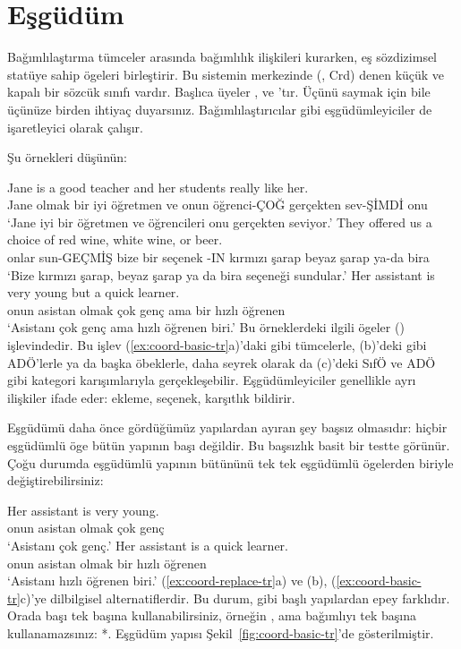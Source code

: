 \section{Eşgüdüm}\label{sec:coordination-tr}

Bağımlılaştırma tümceler arasında bağımlılık ilişkileri kurarken,  eş sözdizimsel statüye sahip ögeleri birleştirir. Bu sistemin merkezinde  (, Crd) denen küçük ve kapalı bir sözcük sınıfı vardır. Başlıca üyeler ,  ve 'tır. Üçünü saymak için bile üçünüze birden ihtiyaç duyarsınız. Bağımlılaştırıcılar gibi eşgüdümleyiciler de işaretleyici olarak çalışır.

Şu örnekleri düşünün:

\ea \label{ex:coord-basic-tr}
    \ea \gll {\ob}Jane is a good teacher{\cb} {\ob}and her students really like her{\cb}.\\
        Jane olmak bir iyi öğretmen ve onun öğrenci-ÇOĞ gerçekten sev-ŞİMDİ onu\\
    \glt `Jane iyi bir öğretmen ve öğrencileri onu gerçekten seviyor.'
    \ex \gll They offered us a choice of {\ob}red wine{\cb}, {\ob}white wine{\cb}, {\ob}or beer{\cb}.\\
        onlar sun-GEÇMİŞ bize bir seçenek -IN kırmızı şarap beyaz şarap ya-da bira\\
    \glt `Bize kırmızı şarap, beyaz şarap ya da bira seçeneği sundular.'
    \ex \gll Her assistant is {\ob}very young{\cb} {\ob}but a quick learner{\cb}.\\
        onun asistan olmak çok genç ama bir hızlı öğrenen\\
    \glt `Asistanı çok genç ama hızlı öğrenen biri.'
    \z
\z
Bu örneklerdeki ilgili ögeler  () işlevindedir. Bu işlev (\ref{ex:coord-basic-tr}a)'daki gibi tümcelerle, (b)'deki gibi ADÖ'lerle ya da başka öbeklerle, daha seyrek olarak da (c)'deki SıfÖ ve ADÖ gibi kategori karışımlarıyla gerçekleşebilir. Eşgüdümleyiciler genellikle ayrı ilişkiler ifade eder:  ekleme,  seçenek,  karşıtlık bildirir.

Eşgüdümü daha önce gördüğümüz yapılardan ayıran şey başsız olmasıdır: hiçbir eşgüdümlü öge bütün yapının başı değildir. Bu başsızlık basit bir testte görünür. Çoğu durumda eşgüdümlü yapının bütününü tek tek eşgüdümlü ögelerden biriyle değiştirebilirsiniz:

\ea \label{ex:coord-replace-tr}
    \ea \gll Her assistant is very young.\\
        onun asistan olmak çok genç\\
    \glt `Asistanı çok genç.'
    \ex \gll Her assistant is a quick learner.\\
        onun asistan olmak bir hızlı öğrenen\\
    \glt `Asistanı hızlı öğrenen biri.'
    \z
\z
(\ref{ex:coord-replace-tr}a) ve (b), (\ref{ex:coord-basic-tr}c)'ye dilbilgisel alternatiflerdir. Bu durum,  gibi başlı yapılardan epey farklıdır. Orada başı tek başına kullanabilirsiniz, örneğin , ama bağımlıyı tek başına kullanamazsınız: *. Eşgüdüm yapısı Şekil~\ref{fig:coord-basic-tr}'de gösterilmiştir.

